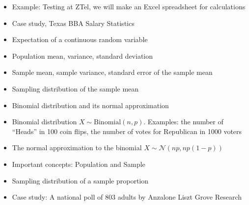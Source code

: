 \documentclass[11pt]{article}
\begin{document}
\begin{itemize}

\item Example: Testing at ZTel, we will make an Excel spreadsheet for calculations


\item Case study, Texas BBA Salary Statistics
\item Expectation of a continuous random variable

\item Population mean, variance, standard deviation
\item Sample mean, sample variance, standard error of the sample mean
\item Sampling distribution of the sample mean

\item Binomial distribution and its normal approximation
%
\item Binomial distribution $X\sim\mbox{Binomial}(n,p)$. Examples: the number of ``Heads'' in 100 coin flips, the number of votes for Republican in 1000 voters
\item The normal approximation to the binomial $X\sim\mathcal{N}\left(np,np(1-p)\right)$
\item Important concepts: Population and Sample
\item Sampling distribution of a sample proportion 
\item Case study: A national poll of 803 adults by Anzalone Liszt Grove Research




\end{itemize}
\end{document}
